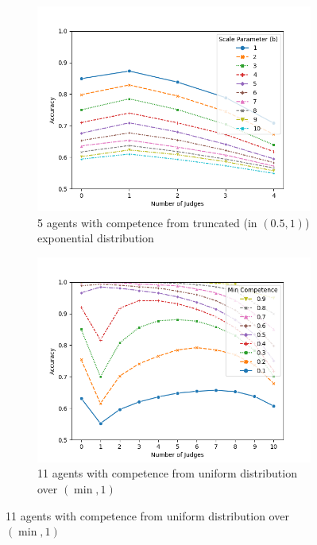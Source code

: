 \documentclass[letterpaper]{article} %
\begin{document}
\begin{figure}[t]
\begin{subfigure}{0.3\textwidth}
 \label{fig:5_gauss}
\end{subfigure}
\hfill
\begin{subfigure}{0.3\textwidth}
 \includegraphics[width=\textwidth]{./Figures/Experiment2_Exponential/Experiment2_exponential_5agents_numjudges_vs_accuracy_compare_b.png}
 \caption{5 agents with competence from truncated (in $(0.5,1)$) exponential distribution}
\label{fig:5_exponential}
\end{subfigure}
\hfill
 \begin{subfigure}{0.3\textwidth}
 \includegraphics[width=\textwidth]{./Figures/Experiment2_Uniform/Experiment2_uniform_11agents_numjudges_vs_accuracy_compare__mincompetences.png}
 \caption{11 agents with competence from uniform distribution over $(\min,1)$}

\end{subfigure}
\end{figure}
\end{document}
